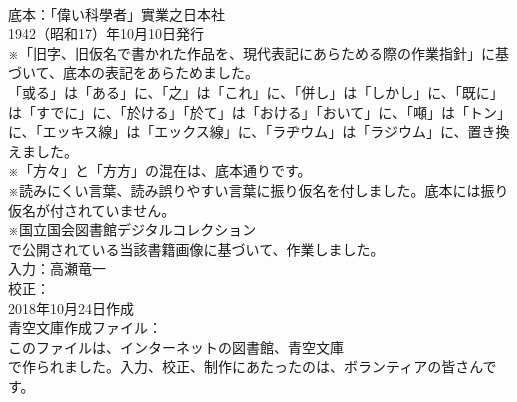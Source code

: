 \documentclass[8pt]{extreport}
\begin{document}
\begin{CJK}{UTF8}{min}
\\	底本：「偉い科學者」實業之日本社
\\	1942（昭和17）年10月10日発行
\\	※「旧字、旧仮名で書かれた作品を、現代表記にあらためる際の作業指針」に基づいて、底本の表記をあらためました。
\\	「或る」は「ある」に、「之」は「これ」に、「併し」は「しかし」に、「既に」は「すでに」に、「於ける」「於て」は「おける」「おいて」に、「噸」は「トン」に、「エッキス線」は「エックス線」に、「ラヂウム」は「ラジウム」に、置き換えました。
\\	※「方々」と「方方」の混在は、底本通りです。
\\	※読みにくい言葉、読み誤りやすい言葉に振り仮名を付しました。底本には振り仮名が付されていません。
\\	※国立国会図書館デジタルコレクション
\\	で公開されている当該書籍画像に基づいて、作業しました。
\\	入力：高瀬竜一
\\	校正：
\\	2018年10月24日作成
\\	青空文庫作成ファイル：
\\	このファイルは、インターネットの図書館、青空文庫
\\	で作られました。入力、校正、制作にあたったのは、ボランティアの皆さんです。
\end{CJK}
\end{document}
